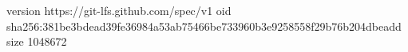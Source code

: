 version https://git-lfs.github.com/spec/v1
oid sha256:381be3bdead39fe36984a53ab75466be733960b3e9258558f29b76b204dbeadd
size 1048672
